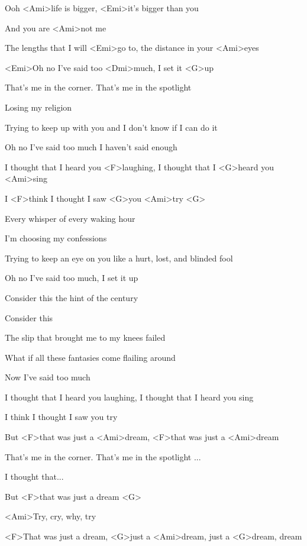 

\zs
Ooh <Ami>life is bigger,
<Emi>it's bigger than you

And you are <Ami>not me

The lengths that I will <Emi>go to,
the distance in your <Ami>eyes

<Emi>Oh no I've said too <Dmi>much,
I set it <G>up
\ks

\zs
That's me in the corner.
That's me in the spotlight

Losing my religion

Trying to keep up with you
and I don't know if I can do it

Oh no I've said too much
I haven't said enough
\ks

\zr
I thought that I heard you <F>laughing,
I thought that I <G>heard you <Ami>sing

I <F>think I thought I saw <G>you <Ami>try <G>
\kr

\zs
Every whisper
of every waking hour

I'm choosing my confessions

Trying to keep an eye on you
like a hurt, lost, and blinded fool

Oh no I've said too much,
I set it up
\ks

\zs
Consider this
the hint of the century

Consider this

The slip that brought me
to my knees failed

What if all these fantasies
come flailing around

Now I've said too much
\ks

\zr
I thought that I heard you laughing,
I thought that I heard you sing

I think I thought I saw you try

But <F>that was just a <Ami>dream,
<F>that was just a <Ami>dream
\kr

\zs
That's me in the corner.
That's me in the spotlight ...
\ks

\zr
I thought that...

But <F>that was just a dream <G>

<Ami>Try, cry, why, try

<F>That was just a dream,
<G>just a <Ami>dream,
just a <G>dream, dream
\kr

\kp
